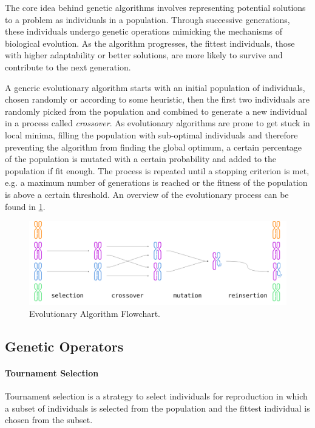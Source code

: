 The core idea behind genetic algorithms involves representing potential solutions to a problem as individuals in a population. Through successive generations, these individuals undergo genetic operations mimicking the mechanisms of biological evolution. As the algorithm progresses, the fittest individuals, those with higher adaptability or better solutions, are more likely to survive and contribute to the next generation.

A generic evolutionary algorithm starts with an initial population of individuals, chosen randomly or according to some heuristic, then the first two individuals are randomly picked from the population and combined to generate a new individual in a process called \textit{crossover}. As evolutionary algorithms are prone to get stuck in local minima, filling the population with sub-optimal individuals and therefore preventing the algorithm from finding the global optimum, a certain percentage of the population is mutated with a certain probability and added to the population if fit enough. The process is repeated until a stopping criterion is met, e.g. a maximum number of generations is reached or the fitness of the population is above a certain threshold. An overview of the evolutionary process can be found in \cref{fig:genetic_algo}.

\begin{figure}
    \centering
    \caption{Evolutionary Algorithm Flowchart.}
    \label{fig:genetic_algo}
    \includegraphics[width=.9\textwidth]{Images/genetic_algo.png}
\end{figure}

\subsection{Genetic Operators}

\paragraph{Tournament Selection}

Tournament selection is a strategy to select individuals for reproduction in which a subset of individuals is selected from the population and the fittest individual is chosen from the subset.

